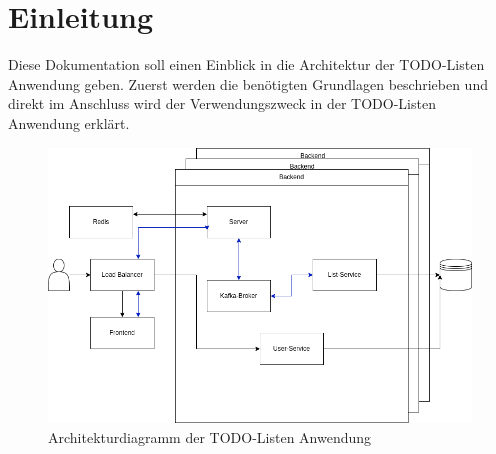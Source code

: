
\chapter{Einleitung}
Diese Dokumentation soll einen Einblick in die Architektur der TODO-Listen Anwendung geben. Zuerst werden die benötigten Grundlagen beschrieben und direkt im Anschluss wird der Verwendungszweck in der TODO-Listen Anwendung erklärt. 

\begin{figure}[H]
	\centering
	\includegraphics[width=1\linewidth]{resources/images/DistributedSystemDiagram.drawio}
	\caption{Architekturdiagramm der TODO-Listen Anwendung}
	\label{fig:DistributedSystemDiagram.drawio}
\end{figure}


